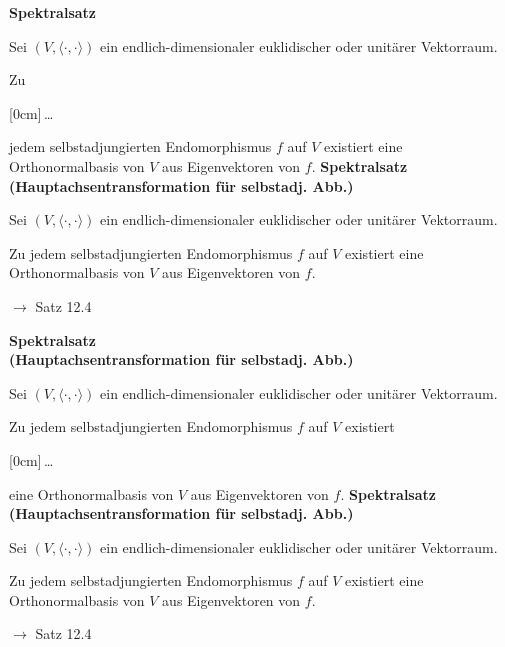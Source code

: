 \documentclass[11pt]{article}
\renewcommand{\cite}[1]{\par\bigskip\hfill{\color{gray}\tiny\(\to\) #1}}
\newcommand*{\scprod}[2]{\langle #1, #2\rangle} %
\newcommand{\hide}[1]{\parbox{0cm}{\raisebox{-7pt}[0cm]{\dots}}\color{white}#1\color{black}}
\let\olddots\dots
\renewcommand{\dots}{\,\olddots\,}
\newenvironment{field}{}{\newpage}
\newif\ifnote
\newenvironment{note}{\notetrue}{\notefalse}
\newcommand{\localtag}{}
\newcommand{\globaltag}{}
\newcommand{\uuid}{}
\newcommand{\tags}[1]{
    \ifnote
        \renewcommand{\localtag}{#1}
    \else
        \renewcommand{\globaltag}{#1}
    \fi
    }
\newcommand{\xplain}[1]{\renewcommand{\uuid}{#1}}
\begin{document}
\begin{note}
    \tags{Satz}
    \xplain{c8642aef-feb0-4273-9657-9874c2229640}
    \begin{field}
        \textbf{Spektralsatz\\}

        Sei $(V, \scprod{\cdot}{\cdot})$ ein endlich-dimensionaler euklidischer oder unitärer Vektorraum.

        Zu \hide{jedem selbstadjungierten Endomorphismus} $f$ auf $V$ existiert eine Orthonormalbasis von $V$ aus Eigenvektoren von $f$.
    \end{field}
    \begin{field}
        \textbf{Spektralsatz\\ (Hauptachsentransformation für selbstadj. Abb.)}

        Sei $(V, \scprod{\cdot}{\cdot})$ ein endlich-dimensionaler euklidischer oder unitärer Vektorraum.

        Zu jedem selbstadjungierten Endomorphismus $f$ auf $V$ existiert eine Orthonormalbasis von $V$ aus Eigenvektoren von $f$.
        \cite{Satz 12.4}
    \end{field}

    \begin{field}
        \textbf{Spektralsatz\\ (Hauptachsentransformation für selbstadj. Abb.)}

        Sei $(V, \scprod{\cdot}{\cdot})$ ein endlich-dimensionaler euklidischer oder unitärer Vektorraum.

        Zu jedem selbstadjungierten Endomorphismus $f$ auf $V$ existiert \hide{eine Orthonormalbasis von $V$ aus Eigenvektoren von $f$.}
    \end{field}
    \begin{field}
        \textbf{Spektralsatz\\ (Hauptachsentransformation für selbstadj. Abb.)}

        Sei $(V, \scprod{\cdot}{\cdot})$ ein endlich-dimensionaler euklidischer oder unitärer Vektorraum.

        Zu jedem selbstadjungierten Endomorphismus $f$ auf $V$ existiert eine Orthonormalbasis von $V$ aus Eigenvektoren von $f$.
        \cite{Satz 12.4}
    \end{field}
\end{note}
\end{document}
